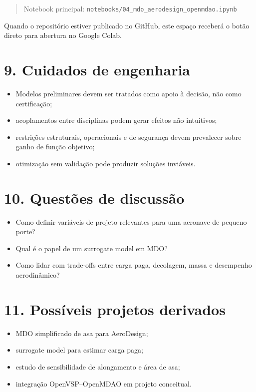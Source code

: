 \documentclass[
  brazilian,
  a4paper,
  DIV=11,
  numbers=noendperiod]{scrreprt}
\providecommand{\tightlist}{%
  \setlength{\itemsep}{0pt}\setlength{\parskip}{0pt}}
\begin{document}
\begin{quote}
Notebook principal:
\texttt{notebooks/04\_mdo\_aerodesign\_openmdao.ipynb}
\end{quote}

Quando o repositório estiver publicado no GitHub, este espaço receberá o
botão direto para abertura no Google Colab.

\section{9. Cuidados de engenharia}\label{cuidados-de-engenharia-3}

\begin{itemize}
\tightlist
\item
  Modelos preliminares devem ser tratados como apoio à decisão, não como
  certificação;
\item
  acoplamentos entre disciplinas podem gerar efeitos não intuitivos;
\item
  restrições estruturais, operacionais e de segurança devem prevalecer
  sobre ganho de função objetivo;
\item
  otimização sem validação pode produzir soluções inviáveis.
\end{itemize}

\section{10. Questões de discussão}\label{questuxf5es-de-discussuxe3o-3}

\begin{itemize}
\tightlist
\item
  Como definir variáveis de projeto relevantes para uma aeronave de
  pequeno porte?
\item
  Qual é o papel de um surrogate model em MDO?
\item
  Como lidar com trade-offs entre carga paga, decolagem, massa e
  desempenho aerodinâmico?
\end{itemize}

\section{11. Possíveis projetos
derivados}\label{possuxedveis-projetos-derivados-3}

\begin{itemize}
\tightlist
\item
  MDO simplificado de asa para AeroDesign;
\item
  surrogate model para estimar carga paga;
\item
  estudo de sensibilidade de alongamento e área de asa;
\item
  integração OpenVSP--OpenMDAO em projeto conceitual.
\end{itemize}
\end{document}
